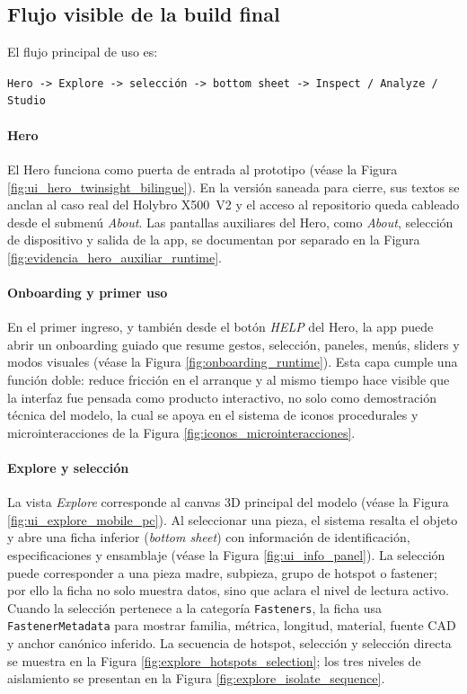 \subsection{Flujo visible de la build final}

El flujo principal de uso es:
\begin{center}
\texttt{Hero -> Explore -> selección -> bottom sheet -> Inspect / Analyze / Studio}
\end{center}

\paragraph{Hero} El Hero funciona como puerta de entrada al prototipo (véase la Figura \ref{fig:ui_hero_twinsight_bilingue}). En la versión saneada para cierre, sus textos se anclan al caso real del Holybro X500~V2 y el acceso al repositorio queda cableado desde el submenú \textit{About}. Las pantallas auxiliares del Hero, como \textit{About}, selección de dispositivo y salida de la app, se documentan por separado en la Figura \ref{fig:evidencia_hero_auxiliar_runtime}.

\paragraph{Onboarding y primer uso} En el primer ingreso, y también desde el botón \textit{HELP} del Hero, la app puede abrir un onboarding guiado que resume gestos, selección, paneles, menús, sliders y modos visuales (véase la Figura \ref{fig:onboarding_runtime}). Esta capa cumple una función doble: reduce fricción en el arranque y al mismo tiempo hace visible que la interfaz fue pensada como producto interactivo, no solo como demostración técnica del modelo, la cual se apoya en el sistema de iconos procedurales y microinteracciones de la Figura \ref{fig:iconos_microinteracciones}.

\paragraph{Explore y selección} La vista \textit{Explore} corresponde al canvas 3D principal del modelo (véase la Figura \ref{fig:ui_explore_mobile_pc}). Al seleccionar una pieza, el sistema resalta el objeto y abre una ficha inferior (\textit{bottom sheet}) con información de identificación, especificaciones y ensamblaje (véase la Figura \ref{fig:ui_info_panel}). La selección puede corresponder a una pieza madre, subpieza, grupo de hotspot o fastener; por ello la ficha no solo muestra datos, sino que aclara el nivel de lectura activo. Cuando la selección pertenece a la categoría \texttt{Fasteners}, la ficha usa \texttt{FastenerMetadata} para mostrar familia, métrica, longitud, material, fuente CAD y anchor canónico inferido. La secuencia de hotspot, selección y selección directa se muestra en la Figura \ref{fig:explore_hotspots_selection}; los tres niveles de aislamiento se presentan en la Figura \ref{fig:explore_isolate_sequence}.

